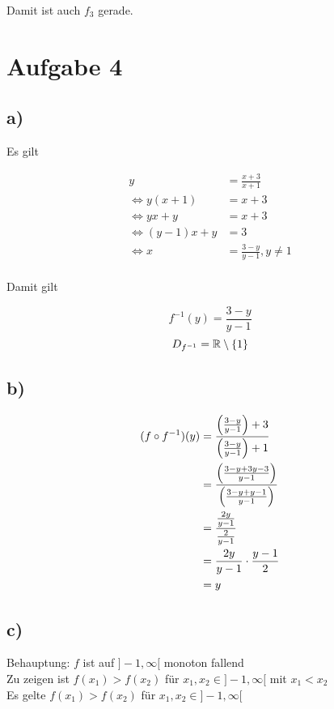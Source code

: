 \documentclass[a4paper, 11pt]{article}
\begin{document}
Damit ist auch \(f_3\) gerade.

\section{Aufgabe 4}
\label{sec:org9f3baed}
\subsection{a)}
\label{sec:orgfb7aac8}
Es gilt

\begin{align*}
    y &= \frac{x+3}{x+1} \\
    \Leftrightarrow y(x+1) &= x+3 \\
    \Leftrightarrow yx+y &= x+3 \\
    \Leftrightarrow (y-1)x+y &= 3 \\
    \Leftrightarrow x &= \frac{3-y}{y-1}, y \neq 1 \\
\end{align*}

Damit gilt

$$ f^{-1}(y) = \frac{3-y}{y-1} $$
$$ D_{f^{-1}} = \mathbb{R} \setminus \{1\} $$

\subsection{b)}
\label{sec:org4522c6d}
\begin{align*}
    (f \circ f^{-1})(y) &= \frac{\left(\frac{3-y}{y-1}\right)+3}{\left(\frac{3-y}{y-1}\right)+1} \\
    &= \frac{\left(\frac{3-y + 3y-3}{y-1}\right)}{\left(\frac{3-y + y-1}{y-1}\right)} \\
    &= \frac{\frac{2y}{y-1}}{\frac{2}{y-1}} \\
    &= \frac{2y}{y-1} \cdot \frac{y-1}{2} \\
    &= y \\
\end{align*}

\subsection{c)}
\label{sec:orgce8603f}
Behauptung: \(f\) ist auf \(]-1, \infty[\) monoton fallend \\

Zu zeigen ist \(f(x_1) > f(x_2)\) für \(x_1, x_2 \in ]-1, \infty[\) mit \(x_1 < x_2\) \\

Es gelte \(f(x_1) > f(x_2)\) für \(x_1, x_2 \in ]-1, \infty[\)
\end{document}
